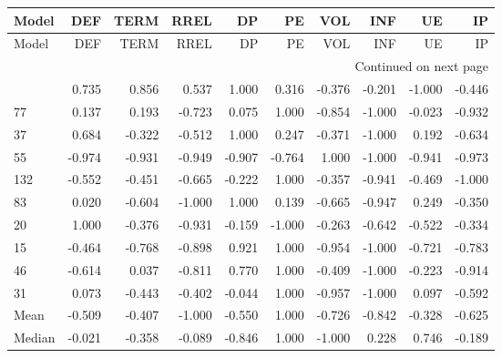 \begin{longtable}{lrrrrrrrrr}
\label{tab:Importance_standardised_10}\\
\toprule
 Model &    DEF &   TERM &   RREL &     DP &     PE &    VOL &    INF &     UE &     IP \\
\midrule
\endfirsthead

\toprule
 Model &    DEF &   TERM &   RREL &     DP &     PE &    VOL &    INF &     UE &     IP \\
\midrule
\endhead
\midrule
\multicolumn{10}{r}{{Continued on next page}} \\
\midrule
\endfoot

\bottomrule
\endlastfoot
    23 &  0.735 &  0.856 &  0.537 &  1.000 &  0.316 & -0.376 & -0.201 & -1.000 & -0.446 \\
    77 &  0.137 &  0.193 & -0.723 &  0.075 &  1.000 & -0.854 & -1.000 & -0.023 & -0.932 \\
    37 &  0.684 & -0.322 & -0.512 &  1.000 &  0.247 & -0.371 & -1.000 &  0.192 & -0.634 \\
    55 & -0.974 & -0.931 & -0.949 & -0.907 & -0.764 &  1.000 & -1.000 & -0.941 & -0.973 \\
   132 & -0.552 & -0.451 & -0.665 & -0.222 &  1.000 & -0.357 & -0.941 & -0.469 & -1.000 \\
    83 &  0.020 & -0.604 & -1.000 &  1.000 &  0.139 & -0.665 & -0.947 &  0.249 & -0.350 \\
    20 &  1.000 & -0.376 & -0.931 & -0.159 & -1.000 & -0.263 & -0.642 & -0.522 & -0.334 \\
    15 & -0.464 & -0.768 & -0.898 &  0.921 &  1.000 & -0.954 & -1.000 & -0.721 & -0.783 \\
    46 & -0.614 &  0.037 & -0.811 &  0.770 &  1.000 & -0.409 & -1.000 & -0.223 & -0.914 \\
    31 &  0.073 & -0.443 & -0.402 & -0.044 &  1.000 & -0.957 & -1.000 &  0.097 & -0.592 \\
  Mean & -0.509 & -0.407 & -1.000 & -0.550 &  1.000 & -0.726 & -0.842 & -0.328 & -0.625 \\
Median & -0.021 & -0.358 & -0.089 & -0.846 &  1.000 & -1.000 &  0.228 &  0.746 & -0.189 \\
\end{longtable}
